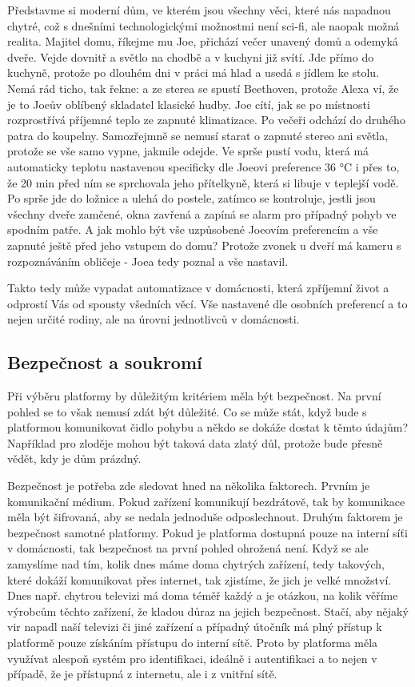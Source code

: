 Představme si moderní dům, ve kterém jsou všechny věci, které nás napadnou chytré, což s dnešními technologickými možnostmi není sci-fi, ale naopak možná realita. Majitel domu, říkejme mu Joe, přichází večer unavený domů a odemyká dveře. Vejde dovnitř a světlo na chodbě a v kuchyni již svítí. Jde přímo do kuchyně, protože po dlouhém dni v práci má hlad a usedá s jídlem ke stolu. Nemá rád ticho, tak řekne:  a ze sterea se spustí Beethoven, protože Alexa ví, že je to Joeův oblíbený skladatel klasické hudby. Joe cítí, jak se po místnosti rozprostřívá příjemné teplo ze zapnuté klimatizace. Po večeři odchází do druhého patra do koupelny. Samozřejmně se nemusí starat o zapnuté stereo ani světla, protože se vše samo vypne, jakmile odejde. Ve sprše pustí vodu, která má automaticky teplotu nastavenou specificky dle Joeovi preference 36 °C i přes to, že 20 min před ním se sprchovala jeho přítelkyně, která si libuje v teplejší vodě. Po sprše jde do ložnice a ulehá do postele, zatímco se kontroluje, jestli jsou všechny dveře zamčené, okna zavřená a zapíná se alarm pro případný pohyb ve spodním patře. A jak mohlo být vše uzpůsobené Joeovím preferencím a vše zapnuté ještě před jeho vstupem do domu? Protože zvonek u dveří má kameru s rozpoznáváním obličeje - Joea tedy poznal a vše nastavil.

Takto tedy může vypadat automatizace v domácnosti, která zpříjemní život a odprostí Vás od spousty všedních věcí. Vše nastavené dle osobních preferencí a to nejen určité rodiny, ale na úrovni jednotlivců v domácnosti.


\subsection{Bezpečnost a soukromí}
Při výběru platformy by důležitým kritériem měla být bezpečnost. Na první pohled se to však nemusí zdát být důležité. Co se může stát, když bude s platformou komunikovat čidlo pohybu a někdo se dokáže dostat k těmto údajům? Například pro zloděje mohou být taková data zlatý důl, protože bude přesně vědět, kdy je dům prázdný.

Bezpečnost je potřeba zde sledovat hned na několika faktorech. Prvním je komunikační médium. Pokud zařízení komunikují bezdrátově, tak by komunikace měla být šifrovaná, aby se nedala jednoduše odposlechnout. Druhým faktorem je bezpečnost samotné platformy. Pokud je platforma dostupná pouze na interní síťi v domácnosti, tak bezpečnost na první pohled ohrožená není. Když se ale zamyslíme nad tím, kolik dnes máme doma chytrých zařízení, tedy takových, které dokáží komunikovat přes internet, tak zjistíme, že jich je velké množství. Dnes např. chytrou televizi má doma téměř každý a je otázkou, na kolik věříme výrobcům těchto zařízení, že kladou důraz na jejich bezpečnost. Stačí, aby nějaký vir napadl naší televizi či jiné zařízení a případný útočník má plný přístup k platformě pouze získáním přístupu do interní sítě. Proto by platforma měla využívat alespoň systém pro identifikaci, ideálně i autentifikaci a to nejen v případě, že je přístupná z internetu, ale i z vnitřní sítě.

